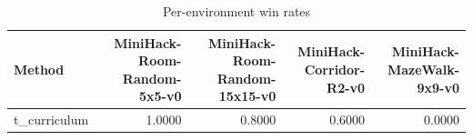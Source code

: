 \begin{table}[htbp]
\centering
\caption{Per-environment win rates}
\label{tab:per-env}
\begin{tabular}{lrrrr}
\toprule
\textbf{Method} & \textbf{MiniHack-Room-Random-5x5-v0} & \textbf{MiniHack-Room-Random-15x15-v0} & \textbf{MiniHack-Corridor-R2-v0} & \textbf{MiniHack-MazeWalk-9x9-v0} \\
\midrule
t\_curriculum & 1.0000 & 0.8000 & 0.6000 & 0.0000 \\
\bottomrule
\end{tabular}
\end{table}